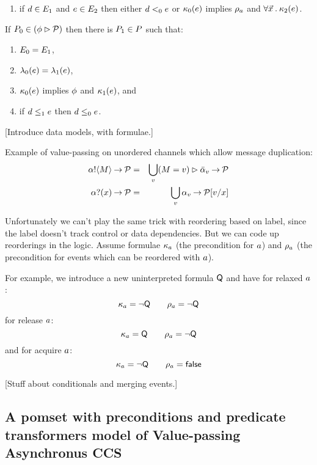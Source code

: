 \begin{figure*}
\begin{enumerate}
  \item if $d\in E_1$ and $e\in E_2$ then either $d<_0e$ or 
    $\kappa_0(e)$ implies $\rho_a$ and $\forall\vec{x}\mathbin.\kappa_2(e)$.
  \end{enumerate}
  If $P_0 \in (\phi\mathbin\rhd\mathcal{P})$ then there is $P_1\in P$ such that:
  \begin{enumerate}
  \item $E_0 = E_1$,
  \item $\lambda_0(e) = \lambda_1(e)$,
  \item $\kappa_0(e)$ implies $\phi$ and  $\kappa_1(e)$, and
  \item if $d\le_1e$ then $d\le_0e$.
    \setcounter{pomsetPreGuardCount}{\value{enumi}}
  \end{enumerate}
\caption{Process algebra as sets of pomsets with preconditions}
\end{figure*}

[Introduce data models, with formulae.]

Example of value-passing on unordered channels which allow
message duplication:
\begin{eqnarray*}
  \sSEND\aChan\aExp\wPREFIX\aPSS & = &
  \bigcup_\aVal (\aExp=\aVal) \sGUARD \send\aChan{\aVal} \wPREFIX \aPSS
\\
  \sRECV\aChan\aVar\wPREFIX\aPSS & = &
  \bigcup_\aVal \recv\aChan{\aVal} \wPREFIX \aPSS[\aVal/\aVar]
\end{eqnarray*}

Unfortunately we can't play the same trick with reordering based on
label, since the label doesn't track control or data dependencies. But
we can code up reorderings in the logic. Assume formulae
$\kappa_a$ (the precondition for $a$) and
$\rho_a$ (the precondition for events which can be reordered with $a$).

For example, we introduce a new uninterpreted formula $\mathsf{Q}$
and have for relaxed $a$:
\[
  \kappa_{a} = \neg\mathsf{Q}
\qquad
  \rho_{a} = \neg\mathsf{Q}
\]
for release $a$:
\[
  \kappa_{a} = \mathsf{Q}
\qquad
  \rho_{a} = \neg\mathsf{Q}
\]
and for acquire $a$:
\[
  \kappa_{a} = \neg\mathsf{Q}
\qquad
  \rho_{a} = \mathsf{false}
\]

[Stuff about conditionals and merging events.]

\subsection{A pomset with preconditions and predicate transformers model of Value-passing Asynchronus CCS}

